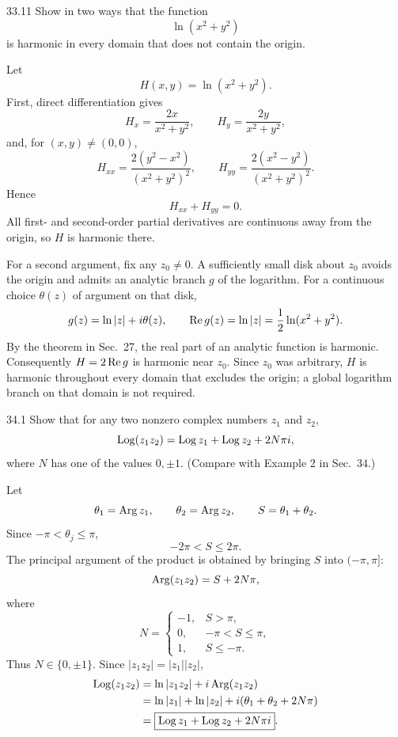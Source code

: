 \documentclass[11pt,oneside]{article}
\begin{document}
\begin{exercise}{33.11}
Show in two ways that the function
\[
    \ln(x^2+y^2)
\]
is harmonic in every domain that does not contain the origin.
\end{exercise}

\begin{solution}
Let
\[
    H(x, y)=\ln(x^2+y^2).
\]
First, direct differentiation gives
\[
    H_x=\frac{2x}{x^2+y^2},
    \qquad
    H_y=\frac{2y}{x^2+y^2},
\]
and, for \((x, y)\ne(0, 0)\),
\[
    H_{xx}=\frac{2(y^2-x^2)}{(x^2+y^2)^2},
    \qquad
    H_{yy}=\frac{2(x^2-y^2)}{(x^2+y^2)^2}.
\]
Hence
\[
    H_{xx}+H_{yy}=0.
\]
All first- and second-order partial derivatives are continuous away from the origin, so \(H\) is harmonic there.

For a second argument, fix any \(z_0\ne0\). A sufficiently small disk about \(z_0\) avoids the origin and admits an analytic branch \(g\) of the logarithm. For a continuous choice \(\theta(z)\) of argument on that disk,
\[
    g(z)=\ln|z|+i\theta(z),
    \qquad
    \operatorname{Re} g(z)=\ln|z|=\frac12\ln(x^2+y^2).
\]
By the theorem in Sec.~27, the real part of an analytic function is harmonic. Consequently \(H=2\operatorname{Re} g\) is harmonic near \(z_0\). Since \(z_0\) was arbitrary, \(H\) is harmonic throughout every domain that excludes the origin; a global logarithm branch on that domain is not required.
\end{solution}

\begin{exercise}{34.1}
Show that for any two nonzero complex numbers \(z_1\) and \(z_2\),
\[
    \operatorname{Log}(z_1z_2)=\operatorname{Log} z_1+\operatorname{Log} z_2+2N\pi i,
\]
where \(N\) has one of the values \(0, \pm1\). (Compare with Example 2 in Sec.~34.)
\end{exercise}

\begin{solution}
Let
\[
    \theta_1=\operatorname{Arg} z_1,
    \qquad
    \theta_2=\operatorname{Arg} z_2,
    \qquad
    S=\theta_1+\theta_2.
\]
Since \(-\pi<\theta_j\le\pi\),
\[
    -2\pi<S\le2\pi.
\]
The principal argument of the product is obtained by bringing \(S\) into \((-\pi, \pi]\):
\[
    \operatorname{Arg}(z_1z_2)=S+2N\pi,
\]
where
\[
    N=
    \begin{cases}
        -1, & S>\pi, \\
        0, & -\pi<S\le\pi, \\
        1, & S\le-\pi.
    \end{cases}
\]
Thus \(N\in\{0, \pm1\}\). Since \(|z_1z_2|=|z_1||z_2|\),
\[
\begin{aligned}
    \operatorname{Log}(z_1z_2)
    &=\ln|z_1z_2|+i\operatorname{Arg}(z_1z_2)\\
    &=\ln|z_1|+\ln|z_2|+i(\theta_1+\theta_2+2N\pi)\\
    &=\boxed{\operatorname{Log} z_1+\operatorname{Log} z_2+2N\pi i}.
\end{aligned}
\]
\end{solution}
\end{document}
